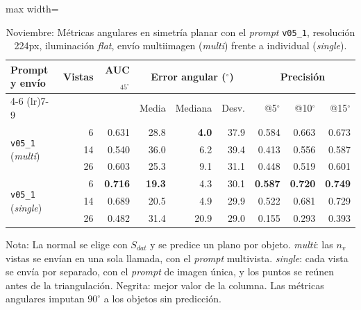 \begin{table}[htbp]
\centering
\caption{Noviembre: Métricas angulares en simetría planar con el \textit{prompt} \texttt{v05\_1}, resolución 224px, iluminación \textit{flat}, envío multiimagen (\textit{multi}) frente a individual (\textit{single}).}
\label{tab:nov_plane_modo_envio_angular}
\begin{lrbox}{\tablebox}
\begin{adjustbox}{max width=\textwidth}
\begin{tabular}{lrrrrrrrr}
\toprule
\multirow{2}{*}{Prompt y envío} & \multirow{2}{*}{Vistas} & \multirow{2}{*}{AUC$_{45^\circ}$} & \multicolumn{3}{c}{Error angular ($^\circ$)} & \multicolumn{3}{c}{Precisión} \\
\cmidrule(lr){4-6} \cmidrule(lr){7-9}
 &  &  & Media & Mediana & Desv. & @5$^\circ$ & @10$^\circ$ & @15$^\circ$ \\
\midrule
\multirow{3}{*}{\texttt{v05\_1} (\textit{multi})} & 6 & 0.631 & 28.8 & \textbf{4.0} & 37.9 & 0.584 & 0.663 & 0.673 \\
 & 14 & 0.540 & 36.0 & 6.2 & 39.4 & 0.413 & 0.556 & 0.587 \\
 & 26 & 0.603 & 25.3 & 9.1 & 31.1 & 0.448 & 0.519 & 0.601 \\
\midrule
\multirow{3}{*}{\texttt{v05\_1} (\textit{single})} & 6 & \textbf{0.716} & \textbf{19.3} & 4.3 & 30.1 & \textbf{0.587} & \textbf{0.720} & \textbf{0.749} \\
 & 14 & 0.689 & 20.5 & 4.9 & 29.9 & 0.522 & 0.681 & 0.729 \\
 & 26 & 0.482 & 31.4 & 20.9 & 29.0 & 0.155 & 0.293 & 0.393 \\
\bottomrule
\end{tabular}
\end{adjustbox}
\end{lrbox}
\usebox{\tablebox}

\vspace{1.5ex}
\begin{minipage}{\wd\tablebox}
\footnotesize
Nota: La normal se elige con $S_{dat}$ y se predice un plano por objeto. \textit{multi}: las $n_v$ vistas se envían en una sola llamada, con el \textit{prompt} multivista. \textit{single}: cada vista se envía por separado, con el \textit{prompt} de imagen única, y los puntos se reúnen antes de la triangulación. Negrita: mejor valor de la columna. Las métricas angulares imputan $90^\circ$ a los objetos sin predicción.
\end{minipage}
\end{table}

